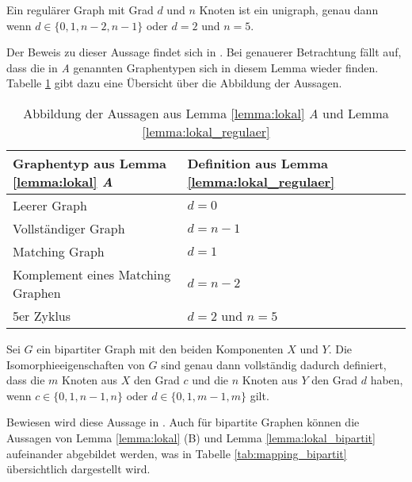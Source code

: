 \begin{Lemma}
	Ein regulärer Graph mit Grad $d$ und $n$ Knoten ist ein \gls{unigraph}, genau dann wenn $d\in \{0,1,n-2,n-1\}$ oder $d=2$ und $n=5$.
	\label{lemma:lokal_regulaer}
\end{Lemma}

Der Beweis zu dieser Aussage findet sich in \cite{johnson1975simple}.
Bei genauerer Betrachtung fällt auf, dass die in \emph{A} genannten Graphentypen sich in diesem Lemma wieder finden. Tabelle \ref{tab:mapping_regulaer} gibt dazu eine Übersicht über die Abbildung der Aussagen.

\begin{table}
	\centering
	\begin{tabular}{|l|l|}
		\hline 
		Graphentyp aus Lemma \ref{lemma:lokal} \emph{A} & Definition aus Lemma \ref{lemma:lokal_regulaer} \\ 
		\hline 
		Leerer Graph & $d=0$ \\ 
		\hline 
		Vollständiger Graph & $d=n-1$ \\ 
		\hline 
		Matching Graph & $d=1$ \\ 
		\hline 
		Komplement eines Matching Graphen & $d=n-2$ \\ 
		\hline 
		5er Zyklus & $d=2$ und $n=5$ \\ 
		\hline 
	\end{tabular}
	\caption{Abbildung der Aussagen aus Lemma \ref{lemma:lokal} \emph{A} und Lemma \ref{lemma:lokal_regulaer}}
	\label{tab:mapping_regulaer}
\end{table}

\begin{Lemma}
	Sei $G$ ein bipartiter Graph mit den beiden Komponenten $X$ und $Y$. 
	Die Isomorphieeigenschaften von $G$ sind genau dann vollständig dadurch definiert, dass die $m$ Knoten aus $X$ den Grad $c$ und die $n$ Knoten aus $Y$ den Grad $d$ haben, wenn $c\in \{0,1,n-1,n\}$ oder $d\in \{0,1,m-1,m\}$ gilt.
	\label{lemma:lokal_bipartit}
\end{Lemma}

Bewiesen wird diese Aussage in \cite{koren1976pairs}.
Auch für bipartite Graphen können die Aussagen von Lemma \ref{lemma:lokal} (B) und Lemma \ref{lemma:lokal_bipartit} aufeinander abgebildet werden, was in Tabelle \ref{tab:mapping_bipartit} übersichtlich dargestellt wird. \\

